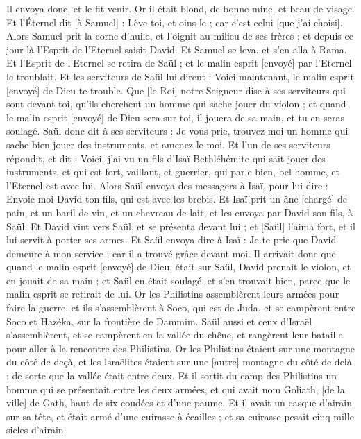 \begin{multicols}{2}
Il envoya donc, et le fit venir. Or il était blond, de bonne mine, et beau de visage. Et l'Éternel dit [à Samuel] : Lève-toi, et oins-le ; car c'est celui [que j'ai choisi].
Alors Samuel prit la corne d'huile, et l'oignit au milieu de ses frères ; et depuis ce jour-là l'Esprit de l'Eternel saisit David. Et Samuel se leva, et s'en alla à Rama.
Et l'Esprit de l'Eternel se retira de Saül ; et le malin esprit [envoyé] par l'Eternel le troublait.
Et les serviteurs de Saül lui dirent : Voici maintenant, le malin esprit [envoyé] de Dieu te trouble.
Que [le Roi] notre Seigneur dise à ses serviteurs qui sont devant toi, qu'ils cherchent un homme qui sache jouer du violon ; et quand le malin esprit [envoyé] de Dieu sera sur toi, il jouera de sa main, et tu en seras soulagé.
Saül donc dit à ses serviteurs : Je vous prie, trouvez-moi un homme qui sache bien jouer des instruments, et amenez-le-moi.
Et l'un de ses serviteurs répondit, et dit : Voici, j'ai vu un fils d'Isaï Bethléhémite qui sait jouer des instruments, et qui est fort, vaillant, et guerrier, qui parle bien, bel homme, et l'Eternel est avec lui.
Alors Saül envoya des messagers à Isaï, pour lui dire : Envoie-moi David ton fils, qui est avec les brebis.
Et Isaï prit un âne [chargé] de pain, et un baril de vin, et un chevreau de lait, et les envoya par David son fils, à Saül.
Et David vint vers Saül, et se présenta devant lui ; et [Saül] l'aima fort, et il lui servit à porter ses armes.
Et Saül envoya dire à Isaï : Je te prie que David demeure à mon service ; car il a trouvé grâce devant moi.
Il arrivait donc que quand le malin esprit [envoyé] de Dieu, était sur Saül, David prenait le violon, et en jouait de sa main ; et Saül en était soulagé, et s'en trouvait bien, parce que le malin esprit se retirait de lui.
\VerseOne{}Or les Philistins assemblèrent leurs armées pour faire la guerre, et ils s'assemblèrent à Soco, qui est de Juda, et se campèrent entre Soco et Hazéka, sur la frontière de Dammim.
Saül aussi et ceux d'Israël s'assemblèrent, et se campèrent en la vallée du chêne, et rangèrent leur bataille pour aller à la rencontre des Philistins.
Or les Philistins étaient sur une montagne du côté de deçà, et les Israëlites étaient sur une [autre] montagne du côté de delà ; de sorte que la vallée était entre deux.
Et il sortit du camp des Philistins un homme qui se présentait entre les deux armées, et qui avait nom Goliath, [de la ville] de Gath, haut de six coudées et d'une paume.
Et il avait un casque d'airain sur sa tête, et était armé d'une cuirasse à écailles ; et sa cuirasse pesait cinq mille sicles d'airain.

\end{multicols}
